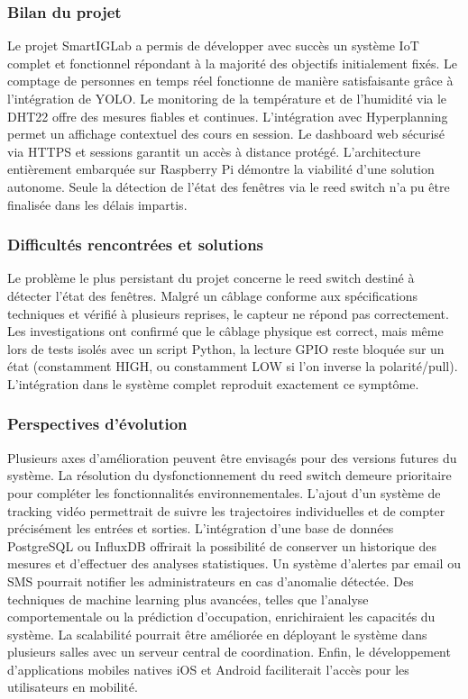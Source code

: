 \documentclass[a4paper,12pt]{report}
\begin{document}
\subsubsection*{Bilan du projet}

Le projet SmartIGLab a permis de développer avec succès un système IoT complet et fonctionnel répondant à la majorité des objectifs initialement fixés. Le comptage de personnes en temps réel fonctionne de manière satisfaisante grâce à l'intégration de YOLO. Le monitoring de la température et de l'humidité via le DHT22 offre des mesures fiables et continues. L'intégration avec Hyperplanning permet un affichage contextuel des cours en session. Le dashboard web sécurisé via HTTPS et sessions garantit un accès à distance protégé. L'architecture entièrement embarquée sur Raspberry Pi démontre la viabilité d'une solution autonome. Seule la détection de l'état des fenêtres via le reed switch n'a pu être finalisée dans les délais impartis.


\subsubsection*{Difficultés rencontrées et solutions}


Le problème le plus persistant du projet concerne le reed switch destiné à détecter l'état des fenêtres. Malgré un câblage conforme aux spécifications techniques et vérifié à plusieurs reprises, le capteur ne répond pas correctement. Les investigations ont confirmé que le câblage physique est correct, mais même lors de tests isolés avec un script Python, la lecture GPIO reste bloquée sur un état (constamment HIGH, ou constamment LOW si l'on inverse la polarité/pull). L'intégration dans le système complet reproduit exactement ce symptôme.




\subsubsection*{Perspectives d'évolution}

Plusieurs axes d'amélioration peuvent être envisagés pour des versions futures du système. La résolution du dysfonctionnement du reed switch demeure prioritaire pour compléter les fonctionnalités environnementales. L'ajout d'un système de tracking vidéo permettrait de suivre les trajectoires individuelles et de compter précisément les entrées et sorties. L'intégration d'une base de données PostgreSQL ou InfluxDB offrirait la possibilité de conserver un historique des mesures et d'effectuer des analyses statistiques. Un système d'alertes par email ou SMS pourrait notifier les administrateurs en cas d'anomalie détectée. Des techniques de machine learning plus avancées, telles que l'analyse comportementale ou la prédiction d'occupation, enrichiraient les capacités du système. La scalabilité pourrait être améliorée en déployant le système dans plusieurs salles avec un serveur central de coordination. Enfin, le développement d'applications mobiles natives iOS et Android faciliterait l'accès pour les utilisateurs en mobilité.
\end{document}
